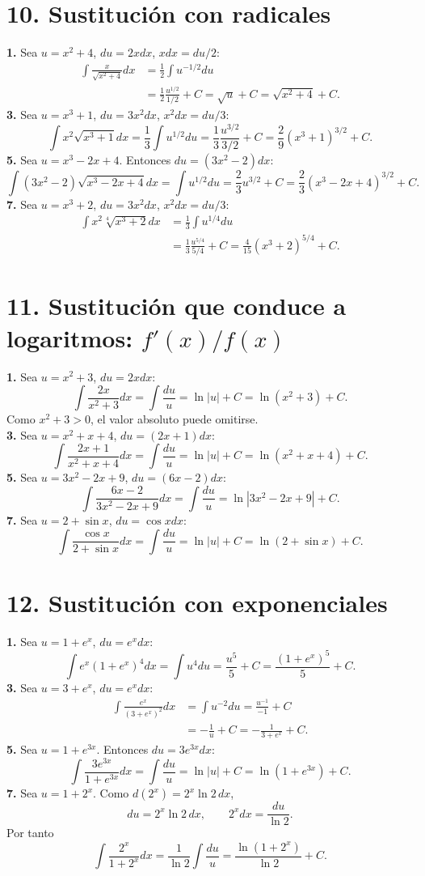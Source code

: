 \documentclass[11pt]{article}
\begin{document}
\section*{10. Sustitución con radicales}
\textbf{1.} Sea $u=x^2+4$, $du=2x dx$, $x dx=du/2$:
\begin{align*}\int\frac{x}{\sqrt{x^2+4}}dx&=\frac12\int u^{-1/2}du\\&=\frac12\frac{u^{1/2}}{1/2}+C=\sqrt{u}+C=\sqrt{x^2+4}+C.\end{align*}
\textbf{3.} Sea $u=x^3+1$, $du=3x^2dx$, $x^2dx=du/3$:
\[\int x^2\sqrt{x^3+1}dx=\frac13\int u^{1/2}du=\frac13\frac{u^{3/2}}{3/2}+C=\frac29(x^3+1)^{3/2}+C.\]
\textbf{5.} Sea $u=x^3-2x+4$. Entonces $du=(3x^2-2)dx$:
\[\int(3x^2-2)\sqrt{x^3-2x+4}dx=\int u^{1/2}du=\frac23u^{3/2}+C=\frac23(x^3-2x+4)^{3/2}+C.\]
\textbf{7.} Sea $u=x^3+2$, $du=3x^2dx$, $x^2dx=du/3$:
\begin{align*}\int x^2\sqrt[4]{x^3+2}dx&=\frac13\int u^{1/4}du\\&=\frac13\frac{u^{5/4}}{5/4}+C=\frac4{15}(x^3+2)^{5/4}+C.\end{align*}

\section*{11. Sustitución que conduce a logaritmos: $f'(x)/f(x)$}
\textbf{1.} Sea $u=x^2+3$, $du=2x dx$:
\[\int\frac{2x}{x^2+3}dx=\int\frac{du}{u}=\ln|u|+C=\ln(x^2+3)+C.\]
Como $x^2+3>0$, el valor absoluto puede omitirse.\\
\textbf{3.} Sea $u=x^2+x+4$, $du=(2x+1)dx$:
\[\int\frac{2x+1}{x^2+x+4}dx=\int\frac{du}{u}=\ln|u|+C=\ln(x^2+x+4)+C.\]
\textbf{5.} Sea $u=3x^2-2x+9$, $du=(6x-2)dx$:
\[\int\frac{6x-2}{3x^2-2x+9}dx=\int\frac{du}{u}=\ln|3x^2-2x+9|+C.\]
\textbf{7.} Sea $u=2+\sin x$, $du=\cos x dx$:
\[\int\frac{\cos x}{2+\sin x}dx=\int\frac{du}{u}=\ln|u|+C=\ln(2+\sin x)+C.\]

\section*{12. Sustitución con exponenciales}
\textbf{1.} Sea $u=1+e^x$, $du=e^x dx$:
\[\int e^x(1+e^x)^4dx=\int u^4du=\frac{u^5}{5}+C=\frac{(1+e^x)^5}{5}+C.\]
\textbf{3.} Sea $u=3+e^x$, $du=e^x dx$:
\begin{align*}\int\frac{e^x}{(3+e^x)^2}dx&=\int u^{-2}du=\frac{u^{-1}}{-1}+C\\&=-\frac1u+C=-\frac1{3+e^x}+C.\end{align*}
\textbf{5.} Sea $u=1+e^{3x}$. Entonces $du=3e^{3x}dx$:
\[\int\frac{3e^{3x}}{1+e^{3x}}dx=\int\frac{du}{u}=\ln|u|+C=\ln(1+e^{3x})+C.\]
\textbf{7.} Sea $u=1+2^x$. Como $d(2^x)=2^x\ln2\,dx$,
\[du=2^x\ln2\,dx,\qquad 2^xdx=\frac{du}{\ln2}.\]
Por tanto
\[\int\frac{2^x}{1+2^x}dx=\frac1{\ln2}\int\frac{du}{u}=\frac{\ln(1+2^x)}{\ln2}+C.\]
\end{document}
